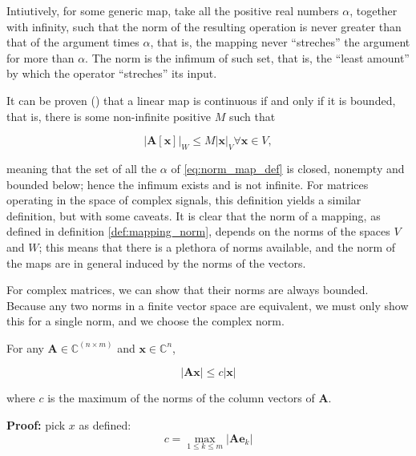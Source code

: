 	Intiutively, for some generic map, take all the positive real numbers $\alpha$, together with infinity, such that the norm of the resulting operation is never greater than that of the argument times $\alpha$, that is, the mapping never ``streches'' the argument for more than $\alpha$. The norm is the infimum of such set, that is, the ``least amount'' by which the operator ``streches'' its input.

	It can be proven (\cite{rudin1991functional}) that a linear map is continuous if and only if it is bounded, that is, there is some non-infinite positive $M$ such that 

\begin{equation} \left\lvert \mathbf{A}\left[\mathbf{x}\right]\right\rvert_W \leq M\left\lvert \mathbf{x}\right\rvert_V \forall \mathbf{x}\in V , \label{eq:matrix_norm_def}\end{equation}

	\noindent meaning that the set of all the $\alpha$ of \eqref{eq:norm_map_def} is closed, nonempty and bounded below; hence the infimum exists and is not infinite. For matrices operating in the space of complex signals, this definition yields a similar definition, but with some caveats. It is clear that the norm of a mapping, as defined in definition \ref{def:mapping_norm}, depends on the norms of the spaces $V$ and $W$; this means that there is a plethora of norms available, and the norm of the maps are in general induced by the norms of the vectors.

	For complex matrices, we can show that their norms are always bounded. Because any two norms in a finite vector space are equivalent, we must only show this for a single norm, and we choose the complex norm.

\begin{theorem}%
	For any $\mathbf{A}\in\mathbb{C}^{(n\times m)}$ and $\mathbf{x}\in\mathbb{C}^{n}$,

\begin{equation} \left\lvert\mathbf{Ax}\right\rvert \leq c\left\lvert \mathbf{x}\right\rvert \end{equation}

	where $c$ is the maximum of the norms of the column vectors of $\mathbf{A}$.
\end{theorem}
\noindent\textbf{Proof:} pick $x$ as defined:
\begin{equation} c = \max_{1\leq k\leq m} \left\lvert\mathbf{Ae}_k\right\rvert\end{equation}

